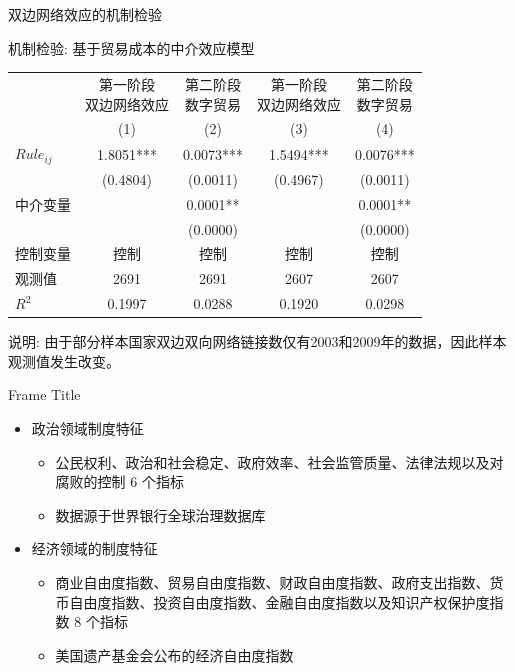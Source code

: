 \documentclass{beamer}
\newcommand{\zhhei}{\CJKfamily{zhhei}}  %
\begin{document}
\begin{frame}{双边网络效应的机制检验}
    \vspace{-0.3cm}
    \centering
    \small
    \begin{threeparttable}
        \captionsetup{font=small}
        \caption{机制检验: 基于贸易成本的中介效应模型}
        \begin{tabular}{lcccc}
            \toprule
            & \makecell[c]{第一阶段 \\ 双边网络效应} & \makecell[c]{第二阶段 \\ 数字贸易} & \makecell[c]{第一阶段 \\ 双边网络效应} & \makecell[c]{第二阶段 \\ 数字贸易} \\
            & (1) & (2) & (3) & (4) \\
            \midrule
            $Rule_{ij}$ & 1.8051*** & 0.0073*** & 1.5494*** & 0.0076*** \\
             & (0.4804) & (0.0011) & (0.4967) & (0.0011) \\
            中介变量 & & 0.0001** & & 0.0001** \\
             & & (0.0000) & & (0.0000) \\
            控制变量 & 控制 & 控制 & 控制 & 控制 \\
            观测值 & 2691 & 2691 & 2607 & 2607 \\
            $R^2$ & 0.1997 & 0.0288 & 0.1920 & 0.0298 \\
            \bottomrule
        \end{tabular}
        \begin{tablenotes}
            \item {\zhhei 说明:} 由于部分样本国家双边双向网络链接数仅有2003和2009年的数据，因此样本观测值发生改变。
        \end{tablenotes}
    \end{threeparttable}
\end{frame}

\begin{frame}{Frame Title}
    \begin{itemize}
        \item 政治领域制度特征
        \begin{itemize}
            \item 公民权利、政治和社会稳定、政府效率、社会监管质量、法律法规以及对腐败的控制 6 个指标
            \item 数据源于世界银行全球治理数据库
        \end{itemize}
        \item 经济领域的制度特征
        \begin{itemize}
            \item 商业自由度指数、贸易自由度指数、财政自由度指数、政府支出指数、货币自由度指数、投资自由度指数、金融自由度指数以及知识产权保护度指数 8 个指标
            \item 美国遗产基金会公布的经济自由度指数
        \end{itemize}
    \end{itemize}
\end{frame}
\end{document}
